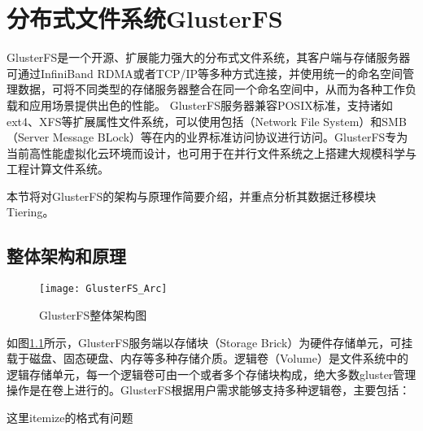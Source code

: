\chapter{分布式文件系统GlusterFS}

GlusterFS\cite{GlusterFS}是一个开源、扩展能力强大的分布式文件系统，其客户端与存储服务器可通过InfiniBand RDMA或者TCP/IP等多种方式连接，并使用统一的命名空间管理数据，可将不同类型的存储服务器整合在同一个命名空间中，从而为各种工作负载和应用场景提供出色的性能。 GlusterFS服务器兼容POSIX标准，支持诸如ext4、XFS等{\color{orange}扩展属性文件系统}，可以使用包括（Network File System）和SMB（Server Message BLock）等在内的业界标准访问协议进行访问。GlusterFS专为当前高性能虚拟化云环境而设计，也可用于在并行文件系统之上搭建大规模科学与工程计算文件系统。 

本节将对GlusterFS的架构与原理作简要介绍，并重点分析其数据迁移模块Tiering。
\section{整体架构和原理}
\begin{figure}[htp]
\centering
\texttt{[image: GlusterFS\_Arc]}
\caption{GlusterFS整体架构图}
\label{fig:GlusterFS_Arc}
\end{figure}
如图\ref{fig:GlusterFS_Arc}所示，GlusterFS服务端以存储块（Storage Brick）为硬件存储单元，可挂载于磁盘、固态硬盘、内存等多种存储介质。逻辑卷（Volume）是文件系统中的逻辑存储单元，每一个逻辑卷可由一个或者多个存储块构成，绝大多数gluster管理操作是在卷上进行的。GlusterFS根据用户需求能够支持多种逻辑卷，主要包括：

{\color{red}这里itemize的格式有问题}

